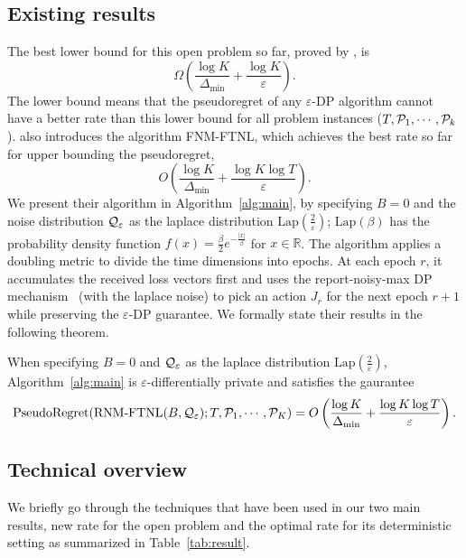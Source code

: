 \subsection{Existing results}
\label{sec:exist}
The best lower bound for this open problem so far, proved by \citet{hu2021near}, is 
$$\Omega\left(\frac{\log K}{\Delta_{\min}} + \frac{\log K}{\varepsilon}\right).$$
The lower bound means that the pseudoregret of any $\varepsilon$-DP algorithm cannot have a better rate than this lower bound for all problem instances ($T, \mathcal{P}_1, \cdots, \mathcal{P}_k$).
\citet{hu2021near} also introduces the algorithm FNM-FTNL, which achieves the best rate so far for upper bounding the pseudoregret, 
$$O\left(\frac{\log K}{\Delta_{\min}} + \frac{\log K \log T}{\varepsilon}\right).$$
We present their algorithm in Algorithm~\ref{alg:main}, by specifying $B=0$ and the noise distribution $\mathcal{Q}_{\varepsilon}$ as the laplace distribution $\mathrm{Lap}(\frac{2}{\varepsilon})$; $\mathrm{Lap}(\beta)$ has the probability density function $f(x)=\frac{\beta}{2}e^{-\frac{|x|}{\beta}}$ for $x\in \mathbb{R}$.
The algorithm applies a doubling metric to divide the time dimensions into epochs. 
At each epoch $r$, it accumulates the received loss vectors first and uses the report-noisy-max DP mechanism~\citep{dwork2014algorithmic} (with the laplace noise) to pick an action $J_r$ for the next epoch $r+1$ while preserving the $\varepsilon$-DP guarantee.
We formally state their results in the following theorem.
\begin{theorem}
\label{thm:eixst} 
	When specifying $B=0$ and $\mathcal{Q}_{\varepsilon}$ as the laplace distribution $\mathrm{Lap}(\frac{2}{\varepsilon})$, Algorithm~\ref{alg:main} is $\varepsilon$-differentially private and satisfies the gaurantee
	\begin{equation}
	\label{eq:pseudo_regret_exist}
	\mathrm{PseudoRegret}(\text{RNM-FTNL}(B, \mathcal{Q}_{\varepsilon}); T, \mathcal{P}_1, \cdots, \mathcal{P}_K) = O\left(\frac{\log K}{\Delta_{\min}} + \frac{\log K\log T}{\varepsilon}\right).
	\end{equation}
\end{theorem}

\subsection{Technical overview}
We briefly go through the techniques that have been used in our two main results, new rate for the open problem and the optimal rate for its deterministic setting as summarized in Table~\ref{tab:result}.

